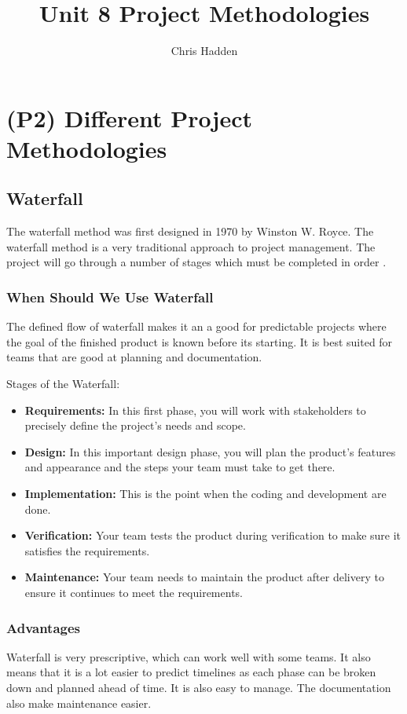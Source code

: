 \documentclass{article}
\title{Unit 8 Project Methodologies}
\author{Chris Hadden}
\date{}
\begin{document}
\maketitle

\section{(P2) Different Project Methodologies}
\subsection{Waterfall}
The waterfall method was first designed in 1970 by Winston W. Royce. The waterfall method is a very traditional approach to project management. The project will go through a number of stages which must be completed in order \cite{waterfallref}.

\subsubsection{When Should We Use Waterfall}
The defined flow of waterfall makes it an a good for predictable projects where the goal of the finished product is known before its starting. It is best suited for teams that are good at planning and documentation.

Stages of the Waterfall:
\begin{itemize}
    \item \textbf{Requirements:} In this first phase, you will work with stakeholders to precisely define the project's needs and scope.
    \item \textbf{Design:} In this important design phase, you will plan the product's features and appearance and the steps your team must take to get there.
    \item \textbf{Implementation:} This is the point when the coding and development are done.
    \item \textbf{Verification:} Your team tests the product during verification to make sure it satisfies the requirements.
    \item \textbf{Maintenance:} Your team needs to maintain the product after delivery to ensure it continues to meet the requirements.
\end{itemize}

\subsubsection{Advantages}
Waterfall is very prescriptive, which can work well with some teams. It also means that it is a lot easier to predict timelines as each phase can be broken down and planned ahead of time.
It is also easy to manage. The documentation also make maintenance easier.
\end{document}

